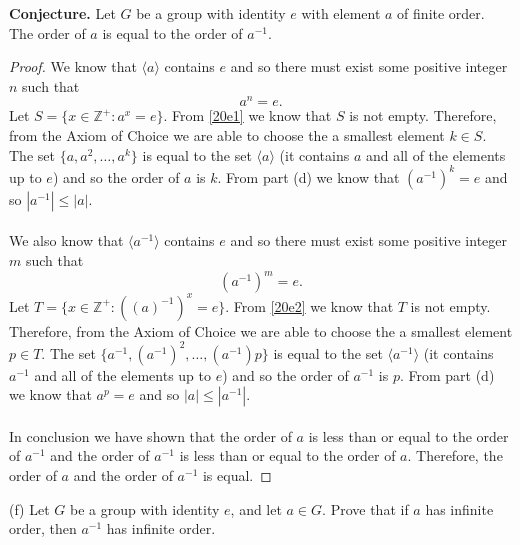 \documentclass[11pt,a4paper]{article}
\begin{document}
{\bf Conjecture.}  Let $G$ be a group with identity $e$ with element $a$ of finite order. The order of $a$ is equal to the order of $a^{-1}$.
\begin{proof}
We know that $\langle a \rangle$ contains $e$ and so there must exist some positive integer $n$ such that
\begin{equation}\label{20e1}
a^n = e.
\end{equation}
Let $S=\{x\in\mathbb{Z}^+:a^x=e\}$. From \eqref{20e1} we know that $S$ is not empty. Therefore, from the Axiom of Choice we are able to choose the a smallest element $k\in S$. The set $\{a,a^2,\ldots,a^k\}$ is equal to the set $\langle a \rangle$ (it contains $a$ and all of the elements up to $e$) and so the order of $a$ is $k$. From part (d) we know that $(a^{-1})^k=e$ and so $|a^{-1}|\leq |a|$.\\
~\\
We also know that $\langle a^{-1} \rangle$ contains $e$ and so there must exist some positive integer $m$ such that
\begin{equation}\label{20e2}
(a^{-1})^m = e.
\end{equation}
Let $T=\{x\in\mathbb{Z}^+:((a)^{-1})^x=e\}$. From \eqref{20e2} we know that $T$ is not empty. Therefore, from the Axiom of Choice we are able to choose the a smallest element $p\in T$. The set $\{a^{-1},(a^{-1})^2,\ldots,(a^{-1})p\}$ is equal to the set $\langle a^{-1} \rangle$ (it contains $a^{-1}$ and all of the elements up to $e$) and so the order of $a^{-1}$ is $p$. From part (d) we know that $a^p=e$ and so $|a|\leq |a^{-1}|$.\\
~\\
In conclusion we have shown that the order of $a$ is less than or equal to the order of $a^{-1}$ and the order of $a^{-1}$ is less than or equal to the order of $a$. Therefore, the order of $a$ and the order of $a^{-1}$ is equal.
\end{proof}

(f) Let $G$ be a group with identity $e$, and let $a \in G$. Prove that if $a$ has infinite
order, then $a^{-1}$ has infinite order.
\end{document}
